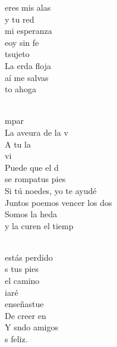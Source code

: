 \documentclass[12pt]{article}
\begin{document}
\begin{multicols*}{2}
\begin{cancion}%
	 eres mis alas\\
	 y tu red\\
	 mi esperanza\\
	 eoy sin fe\\
	tsujeto \\
	La erda floja\\
	 aí me salvas\\
	to ahoga\\\jump\\
	\begin{chorus}%
	mpar\\
	La aveura de la v\\
	A tu la\\
	vi \\
	Puede que el d\\
	se rompatus pies \\
	Si tú noedes, yo te ayudé \\
	Juntos poemos vencer los dos\\
	Somos la heda \\
	y la curen el tiemp \\
	\end{chorus}%
	\jump\\
	estás perdido\\
	 s tus pies\\
	 el camino\\
	 iaré\\
	  enseñastue\\
	De creer en \\
	Y sndo amigos\\
	s feliz.\\\jump\\

\end{cancion}
\end{multicols*}
\end{document}
